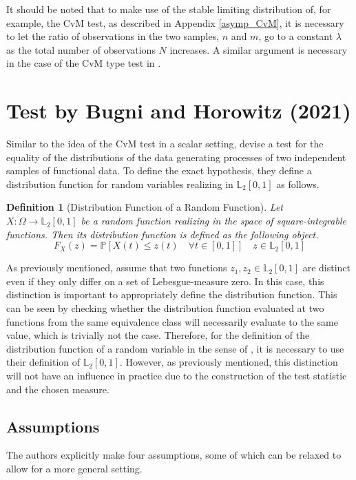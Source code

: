 \documentclass[12pt, a4paper]{article}
\theoremstyle{MAstyle} \newtheorem{assumption}{Assumption}[section]
\theoremstyle{MAstyle} \newtheorem{definition}{Definition}[section]
\theoremstyle{MAstyle} \newtheorem{theorem}{Theorem}[section]
\begin{document}
			It should be noted that to make use of the stable limiting distribution of, for example, the CvM test, as described in Appendix \ref{asymp_CvM}, it is necessary to let the ratio of observations in the two samples, $n$ and $m$, go to a constant $\lambda$ as the total number of observations $N$ increases. A similar argument is necessary in the case of the CvM type test in \cite{bugni_permutation_2021}.
		
	\section{Test by Bugni and Horowitz (2021)}\label{Bugni_Horowitz_2021}
	
		Similar to the idea of the CvM test in a scalar setting, \cite{bugni_permutation_2021} devise a test for the equality of the distributions of the data generating processes of two independent samples of functional data. 
		To define the exact hypothesis, they define a distribution function for random variables realizing in $\mathbb{L}_2[0,1]$ as follows.
		\begin{definition}[Distribution Function of a Random Function]\label{dist_func}
			Let $X:\Omega \rightarrow \mathbb{L}_2[0,1]$ be a random function realizing in the space of square-integrable functions. Then its distribution function is defined as the following object.
			\begin{equation*}
				F_X(z) = \mathbb{P}\left[X(t) \leq z(t) \quad \forall t \in [0,1]\right] \quad z \in \mathbb{L}_2[0,1]
			\end{equation*}
		\end{definition}
		As previously mentioned, \cite{bugni_permutation_2021} assume that two functions $z_1, z_2 \in \mathbb{L}_2[0,1]$ are distinct even if they only differ on a set of Lebesgue-measure zero. In this case, this distinction is important to appropriately define the distribution function. This can be seen by checking whether the distribution function evaluated at two functions from the same equivalence class will necessarily evaluate to the same value, which is trivially not the case. Therefore, for the definition of the distribution function of a random variable in the sense of \cite{bugni_permutation_2021}, it is necessary to use their definition of $\mathbb{L}_2[0,1]$.
		However, as previously mentioned, this distinction will not have an influence in practice due to the construction of the test statistic and the chosen measure.
		
		\subsection{Assumptions}\label{Assumptions}
		The authors explicitly make four assumptions, some of which can be relaxed to allow for a more general setting.
		
\end{document}
